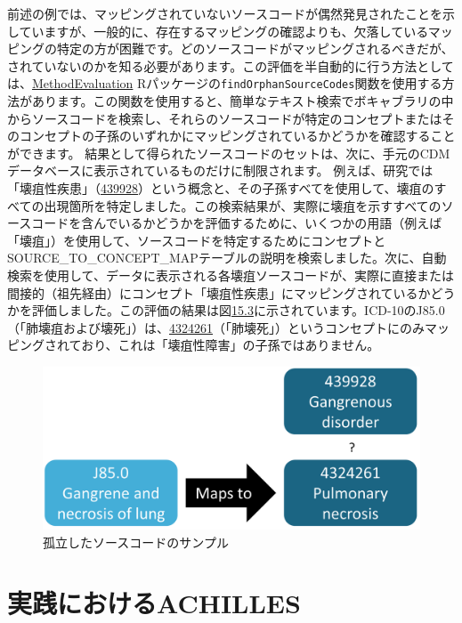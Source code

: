 \documentclass[
  11pt]{book}
\theoremstyle{definition}
\theoremstyle{definition}
\theoremstyle{definition}
\theoremstyle{definition}
\theoremstyle{remark}
\begin{document}
前述の例では、マッピングされていないソースコードが偶然発見されたことを示していますが、一般的に、存在するマッピングの確認よりも、欠落しているマッピングの特定の方が困難です。どのソースコードがマッピングされるべきだが、されていないのかを知る必要があります。この評価を半自動的に行う方法としては、\href{https://ohdsi.github.io/MethodEvaluation/}{MethodEvaluation} Rパッケージの\texttt{findOrphanSourceCodes}関数を使用する方法があります。この関数を使用すると、簡単なテキスト検索でボキャブラリの中からソースコードを検索し、それらのソースコードが特定のコンセプトまたはそのコンセプトの子孫のいずれかにマッピングされているかどうかを確認することができます。 結果として得られたソースコードのセットは、次に、手元のCDMデータベースに表示されているものだけに制限されます。 例えば、研究では「壊疽性疾患」（\href{http://athena.ohdsi.org/search-terms/terms/439928}{439928}）という概念と、その子孫すべてを使用して、壊疽のすべての出現箇所を特定しました。この検索結果が、実際に壊疽を示すすべてのソースコードを含んでいるかどうかを評価するために、いくつかの用語（例えば「壊疽」）を使用して、ソースコードを特定するためにコンセプトとSOURCE\_TO\_CONCEPT\_MAPテーブルの説明を検索しました。次に、自動検索を使用して、データに表示される各壊疽ソースコードが、実際に直接または間接的（祖先経由）にコンセプト「壊疽性疾患」にマッピングされているかどうかを評価しました。この評価の結果は図\href{https://ohdsi.github.io/TheBookOfOhdsi/DataQuality.html\#fig:missingMapping}{15.3}に示されています。ICD-10のJ85.0（「肺壊疽および壊死」）は、\href{http://athena.ohdsi.org/search-terms/terms/4324261}{4324261}（「肺壊死」）というコンセプトにのみマッピングされており、これは「壊疽性障害」の子孫ではありません。

\begin{figure}

{\centering \includegraphics[width=0.7\linewidth]{images/DataQuality/missingMapping} 

}

\caption{孤立したソースコードのサンプル}\label{fig:missingMapping}
\end{figure}

\section{実践におけるACHILLES}\label{achillesInPractice}
\end{document}
